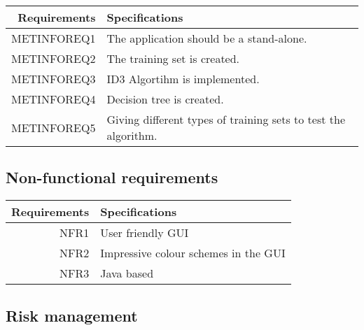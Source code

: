 \documentclass{article}
\begin{document}
\begin{center}
\begin{tabular}{|r|l|}

\hline
Requirements & Specifications\\[5pt]
\hline

METINFOREQ1 &
The application should be a stand-alone.
\\\hline

METINFOREQ2 &
The training set is created.
\\\hline

METINFOREQ3&
ID3 Algortihm is implemented.
\\\hline

METINFOREQ4&
Decision tree is created.
\\\hline

METINFOREQ5&
Giving different types of training sets to test the algorithm.
\\\hline

\end{tabular}
\end{center}

\subsection{Non-functional requirements}

\begin{tabular}{|r|l|}

\hline
Requirements & Specifications\\[5pt]
\hline
NFR1&
User friendly GUI
\\\hline

NFR2&
Impressive colour schemes in the GUI
\\\hline

NFR3&
Java based
\\\hline

\end{tabular}

\subsection{Risk management}
\label{sec:riskman}







\end{document}

